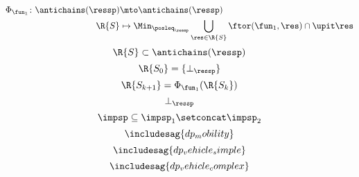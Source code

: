 {\begin{forslides}
\begin{equation*}
            \begin{aligned}
                \Phi_{\fun_1}\colon \antichains(\ressp)&\mto \antichains(\ressp)\\
                \R{S}&\mapsto \Min_{\posleq_\ressp} \bigcup_{\res \in \R{S}}\ftor(\fun_1,\res)\cap \upit \res
            \end{aligned}
        \end{equation*}
        \begin{equation*}
            \label{eq:genfun_11}
            \R{S}\subset \antichains(\ressp)
        \end{equation*}
        \begin{equation*}
            \label{eq:genfun_12}
            \R{S_0}=\{ \bot_\ressp\}
        \end{equation*}
        \begin{equation*}
            \label{eq:genfun_13}
            \R{S_{k+1}}=\Phi_{\fun_1}(\R{S_k})
        \end{equation*}
        \begin{equation*}
            \label{eq:genfun_14}
            \bot_{\ressp}
        \end{equation*}
        \begin{equation*}
            \label{eq:imp_comp}
            \impsp \subseteq \impsp_{1} \setconcat \impsp_{2}
        \end{equation*}
        \begin{equation*}
            \label{eq:dp_mob_1}
            \includesag{dp_mobility}
        \end{equation*}
        \begin{equation*}
            \label{eq:dp_mob_2}
            \includesag{dp_vehicle_simple}
        \end{equation*}
        \begin{equation*}
            \label{eq:dp_mob_3}
            \includesag{dp_vehicle_complex}
        \end{equation*}
        \begin{equation*}

\end{equation*}
\end{forslides}}
